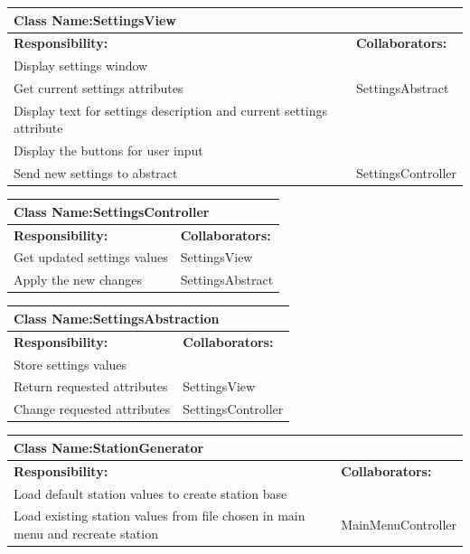 \documentclass[]{article}
\begin{document}
	\begin{table}[ht]
		\centering
		\begin{tabular}{|p{5cm}|p{5cm}|}
		\hline 
		 \multicolumn{2}{|l|}{\textbf{Class Name:}SettingsView} \\
		\hline
		\textbf{Responsibility:} & \textbf{Collaborators:} \\
		\hline
		Display settings window & \\
		\hline
		Get current settings attributes & SettingsAbstract \\
		\hline
		Display text for settings description and current settings attribute & \\
		\hline
		Display the buttons for user input & \\
		\hline
		Send new settings to abstract & SettingsController \\
		\hline
		\end{tabular}
	\end{table}
	\begin{table}[ht]
		\centering
		\begin{tabular}{|p{5cm}|p{5cm}|}
		\hline 
		 \multicolumn{2}{|l|}{\textbf{Class Name:}SettingsController} \\
		\hline
		\textbf{Responsibility:} & \textbf{Collaborators:} \\
		\hline
		Get updated settings values & SettingsView\\
		\hline
		Apply the new changes & SettingsAbstract\\
		\hline
		\end{tabular}
	\end{table}
	\begin{table}[ht]
		\centering
		\begin{tabular}{|p{5cm}|p{5cm}|}
		\hline 
		 \multicolumn{2}{|l|}{\textbf{Class Name:}SettingsAbstraction} \\
		\hline
		\textbf{Responsibility:} & \textbf{Collaborators:} \\
		\hline
		Store settings values & \\
		\hline
		Return requested attributes & SettingsView\\
		\hline
		Change requested attributes & SettingsController\\
		\hline
		\end{tabular}
	\end{table}
	\begin{table}[ht]
		\centering
		\begin{tabular}{|p{5cm}|p{5cm}|}
		\hline 
		 \multicolumn{2}{|l|}{\textbf{Class Name:}StationGenerator} \\
		\hline
		\textbf{Responsibility:} & \textbf{Collaborators:} \\
		\hline
		Load default station values to create station base & \\
		\hline
		Load existing station values from file chosen in main menu and recreate station & MainMenuController\\
		\hline
		\end{tabular}
	\end{table}
\end{document}
